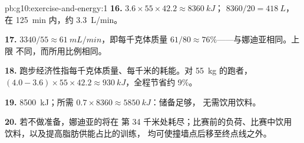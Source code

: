 \begin{solution}{pb:g10:exercise-and-energy:1}
\textbf{16.} $3.6 \times 55 \times 42.2 \approx \qty{8360}{kJ}$；
$8360/20 = \qty{418}{L}$，在 \qty{125}{min} 内，约 \qty{3.3}{L/min}。

\textbf{17.} $3340/55 \approx \qty{61}{mL/min}$，即每千克体质量
$61/80 \approx 76\%$——与娜迪亚相同。上限
不同，而所用比例相同。

\textbf{18.} 跑步经济性指每千克体质量、每千米的耗能。对
\qty{55}{kg} 的跑者，$(4.0 - 3.6) \times 55 \times 42.2 \approx
\qty{930}{kJ}$，全程节省约 9\%。

\textbf{19.}  \qty{8500}{kJ}；所需 $0.7 \times
8360 \approx \qty{5850}{kJ}$：储备足够，
无需饮用饮料。

\textbf{20.} 若不做准备，娜迪亚的将在
第 34 千米处耗尽；比赛前的负荷、比赛中饮用
饮料，以及提高脂肪供能占比的训练，
均可使撞墙点后移至终点线之外。
\end{solution}
